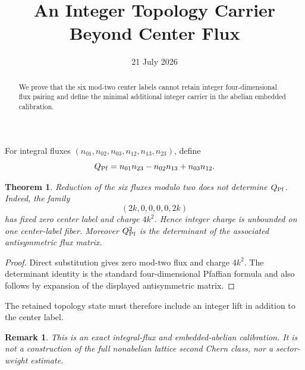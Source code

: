 \documentclass[11pt]{article}\usepackage[margin=1in]{geometry}\usepackage{amsmath,amsthm}\newtheorem{theorem}{Theorem}\newtheorem{remark}{Remark}
\title{An Integer Topology Carrier Beyond Center Flux}\author{}\date{21 July 2026}
\begin{document}
\maketitle
\begin{abstract}We prove that the six mod-two center labels cannot retain integer four-dimensional flux pairing and define the minimal additional integer carrier in the abelian embedded calibration.\end{abstract}
For integral fluxes $(n_{01},n_{02},n_{03},n_{12},n_{13},n_{23})$, define
\[Q_{\rm Pf}=n_{01}n_{23}-n_{02}n_{13}+n_{03}n_{12}.\]
\begin{theorem}Reduction of the six fluxes modulo two does not determine $Q_{\rm Pf}$. Indeed, the family
\[(2k,0,0,0,0,2k)\]
has fixed zero center label and charge $4k^2$. Hence integer charge is unbounded on one center-label fiber. Moreover $Q_{\rm Pf}^2$ is the determinant of the associated antisymmetric flux matrix.\end{theorem}
\begin{proof}Direct substitution gives zero mod-two flux and charge $4k^2$. The determinant identity is the standard four-dimensional Pfaffian formula and also follows by expansion of the displayed antisymmetric matrix.\end{proof}
The retained topology state must therefore include an integer lift in addition to the center label.
\begin{remark}This is an exact integral-flux and embedded-abelian calibration. It is not a construction of the full nonabelian lattice second Chern class, nor a sector-weight estimate.\end{remark}
\end{document}
